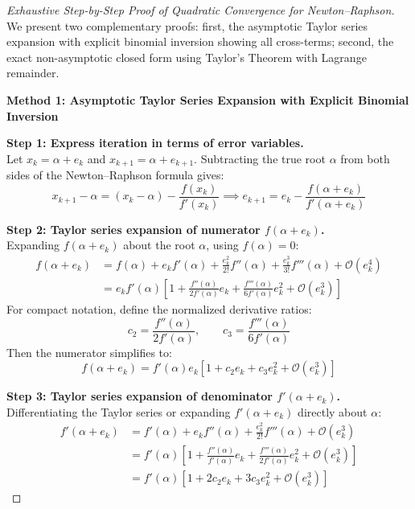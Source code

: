 \begin{proof}[Exhaustive Step-by-Step Proof of Quadratic Convergence for Newton--Raphson]
We present two complementary proofs: first, the asymptotic Taylor series expansion with explicit binomial inversion showing all cross-terms; second, the exact non-asymptotic closed form using Taylor's Theorem with Lagrange remainder.

\medskip
\noindent\textbf{Method 1: Asymptotic Taylor Series Expansion with Explicit Binomial Inversion}

\noindent\textbf{Step 1: Express iteration in terms of error variables.} \\
Let $x_k = \alpha + e_k$ and $x_{k+1} = \alpha + e_{k+1}$. Subtracting the true root $\alpha$ from both sides of the Newton--Raphson formula gives:
\begin{equation}
    x_{k+1} - \alpha = (x_k - \alpha) - \frac{f(x_k)}{f'(x_k)} \implies e_{k+1} = e_k - \frac{f(\alpha + e_k)}{f'(\alpha + e_k)}
\end{equation}

\noindent\textbf{Step 2: Taylor series expansion of numerator $f(\alpha + e_k)$.} \\
Expanding $f(\alpha + e_k)$ about the root $\alpha$, using $f(\alpha) = 0$:
\begin{align}
    f(\alpha + e_k) &= f(\alpha) + e_k f'(\alpha) + \frac{e_k^2}{2!} f''(\alpha) + \frac{e_k^3}{3!} f'''(\alpha) + \mathcal{O}(e_k^4) \nonumber \\
    &= e_k f'(\alpha) \left[ 1 + \frac{f''(\alpha)}{2 f'(\alpha)} e_k + \frac{f'''(\alpha)}{6 f'(\alpha)} e_k^2 + \mathcal{O}(e_k^3) \right]
\end{align}
For compact notation, define the normalized derivative ratios:
\begin{equation}
    c_2 = \frac{f''(\alpha)}{2 f'(\alpha)}, \qquad c_3 = \frac{f'''(\alpha)}{6 f'(\alpha)}
\end{equation}
Then the numerator simplifies to:
\begin{equation}
    f(\alpha + e_k) = f'(\alpha) e_k \left[ 1 + c_2 e_k + c_3 e_k^2 + \mathcal{O}(e_k^3) \right]
\end{equation}

\noindent\textbf{Step 3: Taylor series expansion of denominator $f'(\alpha + e_k)$.} \\
Differentiating the Taylor series or expanding $f'(\alpha + e_k)$ directly about $\alpha$:
\begin{align}
    f'(\alpha + e_k) &= f'(\alpha) + e_k f''(\alpha) + \frac{e_k^2}{2!} f'''(\alpha) + \mathcal{O}(e_k^3) \nonumber \\
    &= f'(\alpha) \left[ 1 + \frac{f''(\alpha)}{f'(\alpha)} e_k + \frac{f'''(\alpha)}{2 f'(\alpha)} e_k^2 + \mathcal{O}(e_k^3) \right] \nonumber \\
    &= f'(\alpha) \left[ 1 + 2 c_2 e_k + 3 c_3 e_k^2 + \mathcal{O}(e_k^3) \right]
\end{align}


\end{proof}
